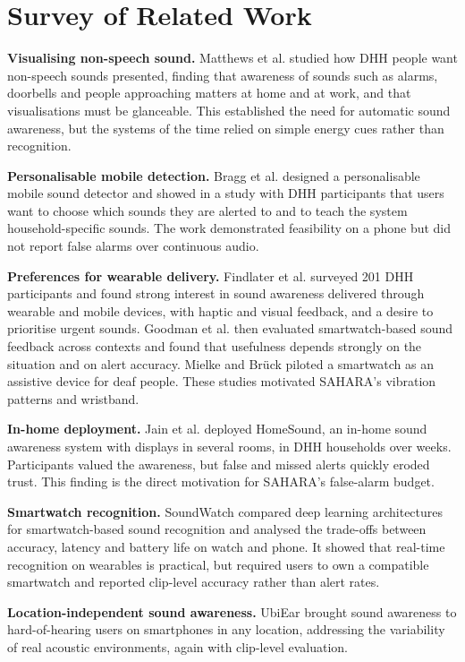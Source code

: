 \documentclass[12pt,a4paper,oneside]{report}
\begin{document}
\section{Survey of Related Work}
\textbf{Visualising non-speech sound.} Matthews et al. \cite{matthews2006} studied how DHH people want non-speech sounds presented, finding that awareness of sounds such as alarms, doorbells and people approaching matters at home and at work, and that visualisations must be glanceable. This established the need for automatic sound awareness, but the systems of the time relied on simple energy cues rather than recognition.

\textbf{Personalisable mobile detection.} Bragg et al. \cite{bragg2016} designed a personalisable mobile sound detector and showed in a study with DHH participants that users want to choose which sounds they are alerted to and to teach the system household-specific sounds. The work demonstrated feasibility on a phone but did not report false alarms over continuous audio.

\textbf{Preferences for wearable delivery.} Findlater et al. \cite{findlater2019} surveyed 201 DHH participants and found strong interest in sound awareness delivered through wearable and mobile devices, with haptic and visual feedback, and a desire to prioritise urgent sounds. Goodman et al. \cite{goodman2020} then evaluated smartwatch-based sound feedback across contexts and found that usefulness depends strongly on the situation and on alert accuracy. Mielke and Br\"uck \cite{mielke2015} piloted a smartwatch as an assistive device for deaf people. These studies motivated SAHARA's vibration patterns and wristband.

\textbf{In-home deployment.} Jain et al. \cite{jain2020homesound} deployed HomeSound, an in-home sound awareness system with displays in several rooms, in DHH households over weeks. Participants valued the awareness, but false and missed alerts quickly eroded trust. This finding is the direct motivation for SAHARA's false-alarm budget.

\textbf{Smartwatch recognition.} SoundWatch \cite{jain2020soundwatch} compared deep learning architectures for smartwatch-based sound recognition and analysed the trade-offs between accuracy, latency and battery life on watch and phone. It showed that real-time recognition on wearables is practical, but required users to own a compatible smartwatch and reported clip-level accuracy rather than alert rates.

\textbf{Location-independent sound awareness.} UbiEar \cite{liu2017ubiear} brought sound awareness to hard-of-hearing users on smartphones in any location, addressing the variability of real acoustic environments, again with clip-level evaluation.
\end{document}
